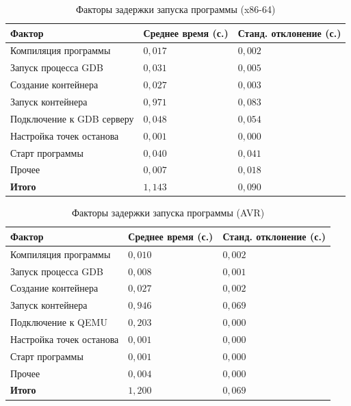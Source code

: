 \documentclass[a4paper,article,14pt]{extarticle}
\begin{document}
\begin{table}[ht]
\small
    \begin{tabular}{|p{6cm}|p{4.5cm}|p{4.5cm}|}
    \hline
    Фактор & Среднее время (с.)  & Станд. отклонение (с.) \\
    \hline
Компиляция программы & $0{,}017$ & $0{,}002$ \\ \hline
Запуск процесса GDB & $0{,}031$ & $0{,}005$ \\ \hline
Создание контейнера & $0{,}027$ & $0{,}003$ \\ \hline
Запуск контейнера & $0{,}971$ & $0{,}083$ \\ \hline
Подключение к GDB серверу & $0{,}048$ & $0{,}054$ \\ \hline
Настройка точек останова & $0{,}001$ & $0{,}000$ \\ \hline
Старт программы & $0{,}040$ & $0{,}041$ \\ \hline
Прочее & $0{,}007$ & $0{,}018$ \\ \hline
\textbf{Итого} & $1{,}143$ & $0{,}090$ \\ \hline
    \end{tabular}
\caption{\label{table:startdelaymeasurements}Факторы задержки запуска программы (x86-64)}
\normalsize
\end{table}

\begin{table}[ht]
\small
    \begin{tabular}{|p{6cm}|p{4.5cm}|p{4.5cm}|}
    \hline
    Фактор & Среднее время (с.)  & Станд. отклонение (с.) \\
    \hline
Компиляция программы & $0{,}010$ & $0{,}002$ \\ \hline
Запуск процесса GDB & $0{,}008$ & $0{,}001$ \\ \hline
Создание контейнера & $0{,}027$ & $0{,}002$ \\ \hline
Запуск контейнера & $0{,}946$ & $0{,}069$ \\ \hline
Подключение к QEMU & $0{,}203$ & $0{,}000$ \\ \hline
Настройка точек останова & $0{,}001$ & $0{,}000$ \\ \hline
Старт программы & $0{,}001$ & $0{,}000$ \\ \hline
Прочее & $0{,}004$ & $0{,}000$ \\ \hline
\textbf{Итого} & $1{,}200$ & $0{,}069$ \\ \hline
    \end{tabular}
\caption{\label{table:startdelaymeasurementsavr}Факторы задержки запуска программы (AVR)}
\normalsize
\end{table}
\end{document}
